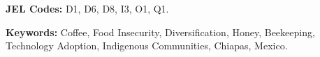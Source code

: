 \begin{titlepage}
\begin{abstract}
\end{abstract}

\vspace{1cm} 
\textbf{\small{}JEL Codes:}{\small{} D1, D6, D8, I3, O1, Q1.}{\small\par}

\textbf{\small{}Keywords:}{\small{} Coffee, Food Insecurity, Diversification, Honey, Beekeeping, Technology Adoption, Indigenous Communities, Chiapas, Mexico.}{\small\par}

\thispagestyle{empty} 

\end{titlepage}